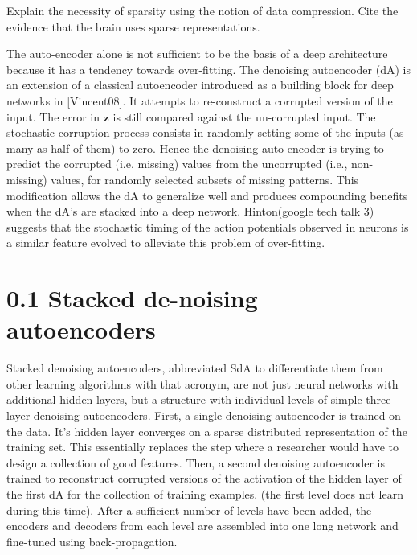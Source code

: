 \documentclass[11pt]{article}
\begin{document}
Explain the necessity of sparsity using the notion of data compression. Cite the evidence that the brain uses sparse representations. 

The auto-encoder alone is not sufficient to be the basis of a deep architecture because it has a tendency towards over-fitting. The denoising autoencoder (dA) is an extension of a classical autoencoder introduced as a building block for deep networks in [Vincent08].  It attempts to re-construct a corrupted version of the input. The error in $\mathbf z$ is still compared against the un-corrupted input. The stochastic corruption process consists in randomly setting some of the inputs (as many as half of them) to zero. Hence the denoising auto-encoder is trying to predict the corrupted (i.e. missing) values from the uncorrupted (i.e., non-missing) values, for randomly selected subsets of missing patterns. This modification allows the dA to generalize well and produces compounding benefits when the dA's are stacked into a deep network. Hinton(google tech talk 3) suggests that the stochastic timing of the action potentials observed in neurons is a similar feature evolved to alleviate this problem of over-fitting.

\section{0.1 Stacked de-noising autoencoders}
\label{Stacked de-noising autoencoders}
Stacked denoising autoencoders, abbreviated SdA to differentiate them from other learning algorithms with that acronym, are not just neural networks with additional hidden layers, but a structure with individual levels of simple three-layer denoising autoencoders. First, a single denoising autoencoder is trained on the data. It's hidden layer converges on a sparse distributed representation of the training set. This essentially replaces the step where a researcher would have to design a collection of good features. Then, a second denoising autoencoder is trained to reconstruct corrupted versions of the activation of the hidden layer of the first dA for the collection of training examples. (the first level does not learn during this time). After a sufficient number of levels have been added, the encoders and decoders from each level are assembled into one long network and fine-tuned using back-propagation.
\end{document}
